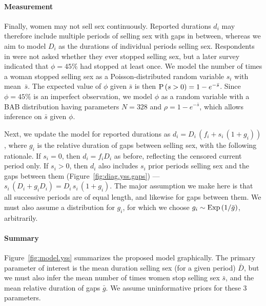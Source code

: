 \paragraph{Measurement}
Finally, women may not sell sex continuously.
Reported durations $d_i$ may therefore include
multiple periods of selling sex with gaps in between,
whereas we aim to model $D_i$ as the durations of individual periods selling sex.
Respondents in \cite{Baral2014} were not asked whether they ever stopped selling sex,
but a later survey \cite{EswKP2014} indicated that $\phi = 45\%$ had stopped at least once.
We model the number of times a woman stopped selling sex as
a Poisson-distributed random variable $s_i$ with mean~$\bar{s}$.
The expected value of $\phi$ given $\bar{s}$ is then $\mathrm{P}\,(s > 0) = 1 - e^{-\bar{s}}$.
Since $\phi = 45\%$ is an imperfect observation,
we model $\phi$ as a random variable with a BAB distribution
having parameters $N = 328$ and $\rho = 1 - e^{-\bar{s}}$,
which allows inference on $\bar{s}$ given $\phi$.
\par
Next, we update the model for reported durations as $d_i = D_i\,(f_i + s_i\,(1 + g_i))$,
where $g_i$ is the relative duration of gaps between selling sex,
with the following rationale.
If $s_i = 0$, then $d_i = f_i D_i$ as before, reflecting the censored current period only.
If $s_i > 0$, then $d_i$ also includes $s_i$ prior periods selling sex and the gaps between them
(Figure~\ref{fig:diag.yss.gaps}) --- \ie $s_i\,(D_i + g_i D_i) = D_i\,s_i\,(1 + g_i)$.
The major assumption we make here is that
all successive periods are of equal length, and likewise for gaps between them.
We must also assume a distribution for $g_i$, for which we choose
$g_i \sim \mathrm{Exp}\,(1/\bar{g})$, arbitrarily.
\paragraph{Summary}
Figure~\ref{fig:model.yss} summarizes the proposed model graphically.
The primary parameter of interest is
the mean duration selling sex (for a given period) $\bar{D}$,
but we must also infer
the mean number of times women stop selling sex $\bar{s}$, and
the mean relative duration of gaps $\bar{g}$.
We assume uninformative priors for these 3 parameters.
